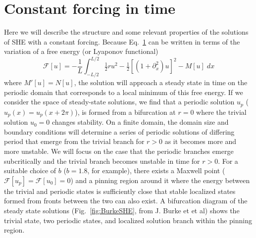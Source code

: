 \documentclass[../main/TimeForcingSHE.tex]{subfiles}
\begin{document}
\section{Constant forcing in time }

Here we will describe the structure and some relevant properties of the  solutions of SHE with a constant forcing.   Because Eq.~\ref{} can be written in terms of the variation of a free energy (or Lyaponov functional)
\begin{equation}
\mathcal{F}[u]=-\frac{1}{L}\int_{-L/2}^{L/2}\tfrac{1}{2}r u^2-\tfrac{1}{2}\left[(1+\partial_x^2)u\right]^2-M[u] \;dx
\end{equation}
where $M'[u]=N[u]$, the solution will approach a steady state in time on the periodic domain that corresponds to a local minimum of this free energy.  If we consider the space of steady-state solutions, we find that a periodic solution $u_p$ ($u_p(x)=u_p(x+2\pi)$), is formed from a bifurcation at $r=0$ where the trivial solution $u_0=0$ changes stability.  On a finite domain, the domain size and boundary conditions will determine a series of periodic solutions of differing period that emerge from the trivial branch for $r>0$ as it becomes more and more unstable.   We will focus on the case that the periodic branches  emerge subcritically and the trivial branch becomes unstable in time for $r>0$.  For a suitable choice of $b$ ($b=1.8$, for example), there exists a Maxwell point ($\mathcal{F}[u_p]=\mathcal{F}[u_0]=0$) and a pinning region around it where the energy between the trivial and periodic states is sufficiently close that stable localized states formed from fronts between the two can also exist.  A bifurcation diagram of the steady state solutions (Fig.~\ref{fig:BurkeSHE}, from J. Burke et et al) shows the trivial state, two periodic states, and localized solution branch within the pinning region.  

\FIGshesnaking
\end{document}
